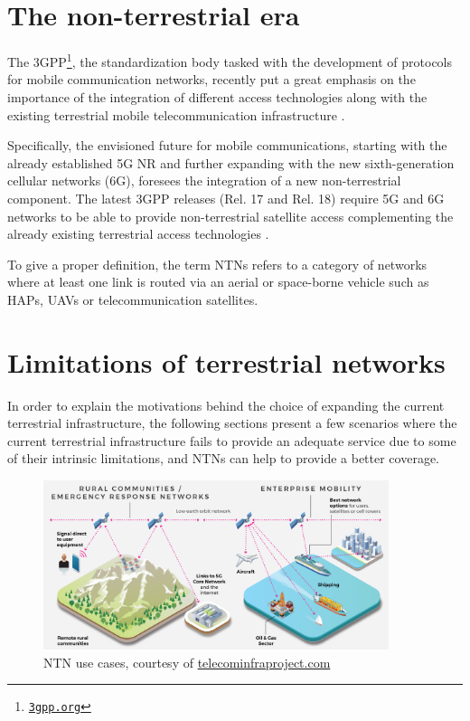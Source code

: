 \section{The non-terrestrial era}
The \ac{3GPP}\footnote{\href{https://www.3gpp.org}{\texttt{3gpp.org}}}, the standardization body tasked with the development of protocols for mobile communication networks, recently put a great emphasis on the importance of the integration of different access technologies along with the existing terrestrial mobile telecommunication infrastructure \cite{3gpp-tr-21.917}.

Specifically, the envisioned future for mobile communications, starting with the already established 5G \ac{NR} and further expanding with the new sixth-generation cellular networks (6G), foresees the integration of a new non-terrestrial component. The latest \ac{3GPP} releases (Rel. 17 and Rel. 18) require 5G and 6G networks to be able to provide non-terrestrial satellite access complementing the already existing terrestrial access technologies \cite{overview-rel-17-18-saad, 5g-nr-communication-geo-leo-maattanen}.

To give a proper definition, the term \ac{NTNs} refers to a category of networks where at least one link is routed via an aerial or space-borne vehicle such as \ac{HAPs}, \ac{UAVs} or telecommunication satellites.

\section{Limitations of terrestrial networks}
In order to explain the motivations behind the choice of expanding the current terrestrial infrastructure, the following sections present a few scenarios where the current terrestrial infrastructure fails to provide an adequate service due to some of their intrinsic limitations, and \ac{NTNs} can help to provide a better coverage.

\begin{figure}[ht]
    \centering
    \includegraphics[width=0.9\textwidth]{res/sat-usecases.png}
    \caption{NTN use cases, courtesy of \href{https://telecominfraproject.com/ntcs/}{telecominfraproject.com}}
    \label{fig:sat-use-cases}
\end{figure}

